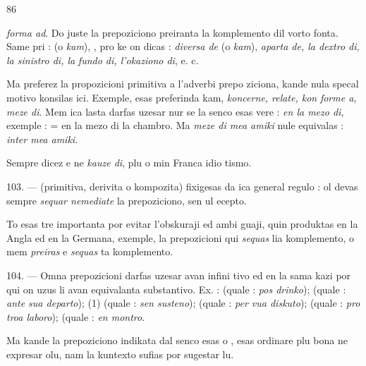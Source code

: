\begin{VUpage}[90]{86}

\VUcontinue
\textit{forma ad}. Do juste la prepoziciono preiranta la komplemento\nl
dil vorto fonta. Same pri :  (o \textit{kam}), \nl
{}, pro ke on dicas :\nl
\textit{diversa de} (o \textit{kam}), \textit{aparta de, la dextro di, la sinistro di, la}\nl
\textit{fundo di, l'okaziono di}, e. c.

Ma preferez la propozicioni primitiva a l'adverbi prepo\cc
ziciona, kande nula specal motivo konsilas ici. Exemple, \nl
{} esas preferinda kam, \textit{koncerne, relate, kon}\cc
\textit{forme a, meze di}. Mem ica lasta darfas uzesar nur se la\nl
senco esas vere : \textit{en la mezo di}, exemple : \cc
{} = en la mezo di la chambro. Ma \textit{meze di mea amiki} nule\nl
equivalas : \textit{inter mea amiki}.

Sempre dicez  e ne \textit{kauze di}, plu o min Franca idio\cc
tismo.

\VUblanc{7.76pt}%
103. --- \nl
(primitiva, derivita o kompozita) fixigesas da ica general\nl
regulo : ol devas sempre \textit{sequar nemediate} la prepoziciono,\nl
sen ul ecepto.

To esas tre importanta por evitar l'obskuraji ed ambi\cc
guaji, quin produktas en la Angla ed en la Germana, exemple,\nl
la prepozicioni qui \textit{sequas} lia komplemento, o mem \textit{preiras}\nl
e \textit{sequas} ta komplemento.

\VUblanc{7.81pt}%
104. --- Omna prepozicioni darfas uzesar avan infini\cc
tivo ed en la sama kazi por qui on uzus li avan equivalanta\nl
substantivo. Ex. :  (quale : \textit{pos drinko});\nl
{} (quale : \textit{ante sua departo}); \nl
{} (1) (quale : \textit{sen susteno});\nl
{} (quale :\nl
\textit{per vua diskuto});  (quale :\nl
\textit{pro troa laboro});  (quale :\nl
\textit{en montro}.

Ma kande la prepoziciono indikata dal senco esas  o ,\nl
esas ordinare plu bona ne expresar olu, nam la kuntexto\nl
sufias por sugestar lu.
\end{VUpage}


